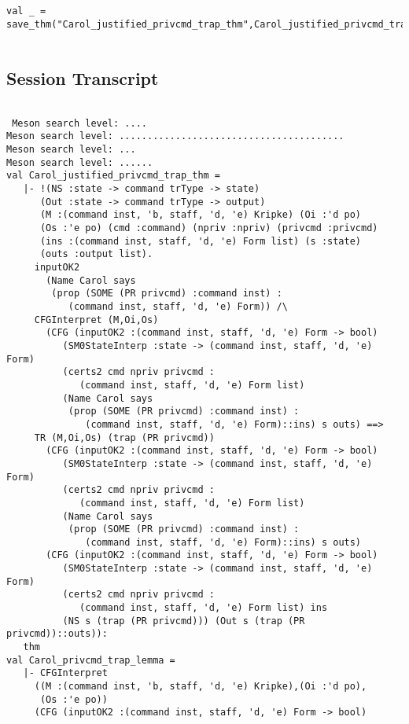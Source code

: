 \documentclass{report}
\begin{document}
\begin{lstlisting}[frame=TBlr]
val _ = save_thm("Carol_justified_privcmd_trap_thm",Carol_justified_privcmd_trap_thm)


\end{lstlisting}

\subsection{Session Transcript}
\label{trans7}
\begin{session}
  \begin{scriptsize}
\begin{verbatim}

 Meson search level: ....
Meson search level: ........................................
Meson search level: ...
Meson search level: ......
val Carol_justified_privcmd_trap_thm =
   |- !(NS :state -> command trType -> state)
      (Out :state -> command trType -> output)
      (M :(command inst, 'b, staff, 'd, 'e) Kripke) (Oi :'d po)
      (Os :'e po) (cmd :command) (npriv :npriv) (privcmd :privcmd)
      (ins :(command inst, staff, 'd, 'e) Form list) (s :state)
      (outs :output list).
     inputOK2
       (Name Carol says
        (prop (SOME (PR privcmd) :command inst) :
           (command inst, staff, 'd, 'e) Form)) /\
     CFGInterpret (M,Oi,Os)
       (CFG (inputOK2 :(command inst, staff, 'd, 'e) Form -> bool)
          (SM0StateInterp :state -> (command inst, staff, 'd, 'e) Form)
          (certs2 cmd npriv privcmd :
             (command inst, staff, 'd, 'e) Form list)
          (Name Carol says
           (prop (SOME (PR privcmd) :command inst) :
              (command inst, staff, 'd, 'e) Form)::ins) s outs) ==>
     TR (M,Oi,Os) (trap (PR privcmd))
       (CFG (inputOK2 :(command inst, staff, 'd, 'e) Form -> bool)
          (SM0StateInterp :state -> (command inst, staff, 'd, 'e) Form)
          (certs2 cmd npriv privcmd :
             (command inst, staff, 'd, 'e) Form list)
          (Name Carol says
           (prop (SOME (PR privcmd) :command inst) :
              (command inst, staff, 'd, 'e) Form)::ins) s outs)
       (CFG (inputOK2 :(command inst, staff, 'd, 'e) Form -> bool)
          (SM0StateInterp :state -> (command inst, staff, 'd, 'e) Form)
          (certs2 cmd npriv privcmd :
             (command inst, staff, 'd, 'e) Form list) ins
          (NS s (trap (PR privcmd))) (Out s (trap (PR privcmd))::outs)):
   thm
val Carol_privcmd_trap_lemma =
   |- CFGInterpret
     ((M :(command inst, 'b, staff, 'd, 'e) Kripke),(Oi :'d po),
      (Os :'e po))
     (CFG (inputOK2 :(command inst, staff, 'd, 'e) Form -> bool)

\end{verbatim}
\end{scriptsize}
\end{session}
\end{document}
